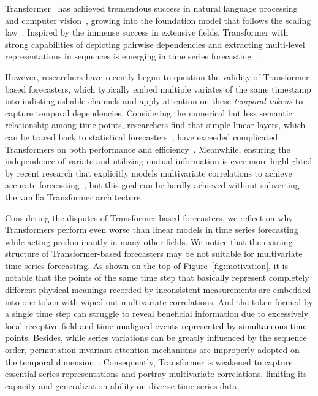 \documentclass{article} %
\newcommand{\update}[1]{{\textcolor{black}{#1}}}
\begin{document}
Transformer~\citep{Transformer} has achieved tremendous success in natural language processing~\citep{brown2020language} and computer vision~\citep{dosovitskiy2020image}, growing into the foundation model that follows the scaling law~\citep{kaplan2020scaling}. Inspired by the immense success in extensive fields, Transformer with strong capabilities of depicting pairwise dependencies and extracting multi-level representations in sequences is emerging in time series forecasting~\citep{Autoformer, PatchTST}. 


However, researchers have recently begun to question the validity of Transformer-based forecasters, which typically embed multiple variates of the same timestamp into indistinguishable channels and apply attention on these \emph{temporal tokens} to capture temporal dependencies. Considering the numerical but less semantic relationship among time points, researchers find that simple linear layers, which can be traced back to statistical forecasters~\citep{box1968some}, have exceeded complicated Transformers on both performance and efficiency~\citep{DLinear, das2023long}. Meanwhile, ensuring the independence of variate and utilizing mutual information is ever more highlighted by recent research that explicitly models multivariate correlations to achieve accurate forecasting~\citep{Crossformer, TSMixer}, but this goal can be hardly achieved without subverting the vanilla Transformer architecture.


Considering the disputes of Transformer-based forecasters, we reflect on why Transformers perform even worse than linear models in time series forecasting while acting predominantly in many other fields. We notice that the existing structure of Transformer-based forecasters may be not suitable for multivariate time series forecasting. As shown on the top of Figure~\ref{fig:motivation}, it is notable that the points of the same time step that basically represent completely different physical meanings recorded by inconsistent measurements are embedded into one token with wiped-out multivariate correlations. And the token formed by a single time step can struggle to reveal beneficial information due to excessively local receptive field and \update{time-unaligned events represented by simultaneous time points}. Besides, while series variations can be greatly influenced by the sequence order, permutation-invariant attention mechanisms are improperly adopted on the temporal dimension~\citep{DLinear}. Consequently, Transformer is weakened to capture essential series representations and portray multivariate correlations, limiting its capacity and generalization ability on diverse time series data.
\end{document}
